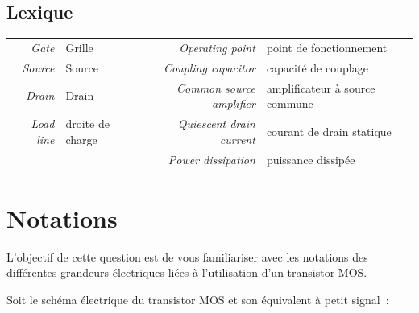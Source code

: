 \documentclass{../template/tp}
\begin{document}
\subsection{Lexique}
\begin{center}
\begin{footnotesize}
\begin{tabular}{rl|rl}
\textit{Gate} & Grille 		& \textit{Operating point	} & point de fonctionnement \\
\textit{Source} & Source 	& \textit{Coupling capacitor} & capacité de couplage\\ 
\textit{Drain} & Drain 		& \textit{Common source amplifier} & amplificateur à source commune\\
\textit{Load line} & droite de charge & \textit{Quiescent drain current} & courant de drain statique \\ 
& & \textit{Power dissipation} & puissance dissipée \\
\end{tabular} 
\end{footnotesize}
\end{center}
\newpage
\section{Notations}
L’objectif de cette question est de vous familiariser avec les notations des différentes grandeurs électriques liées à l'utilisation d'un transistor MOS.

Soit le schéma électrique du transistor MOS et son équivalent à petit signal~:
\end{document}
